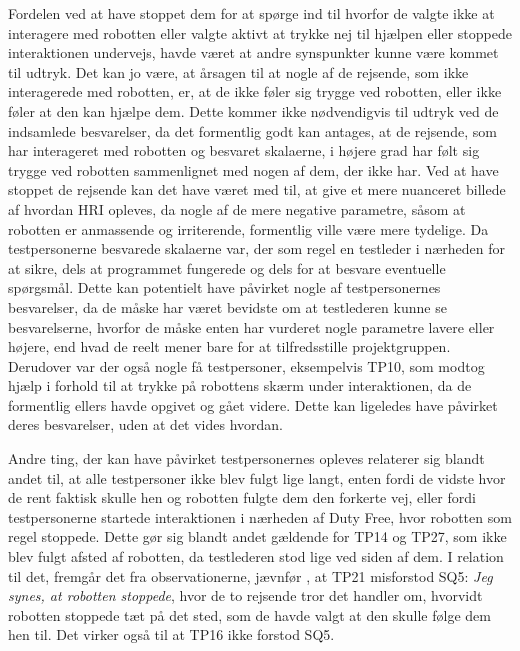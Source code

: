 Fordelen ved at have stoppet dem for at spørge ind til hvorfor de valgte ikke at interagere med robotten eller valgte aktivt at trykke nej til hjælpen eller stoppede interaktionen undervejs, havde været at andre synspunkter kunne være kommet til udtryk. Det kan jo være, at årsagen til at nogle af de rejsende, som ikke interagerede med robotten, er, at de ikke føler sig trygge ved robotten, eller ikke føler at den kan hjælpe dem. Dette kommer ikke nødvendigvis til udtryk ved de indsamlede besvarelser, da det formentlig godt kan antages, at de rejsende, som har interageret med robotten og besvaret skalaerne, i højere grad har følt sig trygge ved robotten sammenlignet med nogen af dem, der ikke har. Ved at have stoppet de rejsende kan det have været med til, at give et mere nuanceret billede af hvordan HRI opleves, da nogle af de mere negative parametre, såsom at robotten er anmassende og irriterende, formentlig ville være mere tydelige. \blankline
%
Da testpersonerne besvarede skalaerne var, der som regel en testleder i nærheden for at sikre, dels at programmet fungerede og dels for at besvare eventuelle spørgsmål. Dette kan potentielt have påvirket nogle af testpersonernes besvarelser, da de måske har været bevidste om at testlederen kunne se besvarelserne, hvorfor de måske enten har vurderet nogle parametre lavere eller højere, end hvad de reelt mener bare for at tilfredsstille projektgruppen. Derudover var der også nogle få testpersoner, eksempelvis TP10, som modtog hjælp i forhold til at trykke på robottens skærm under interaktionen, da de formentlig ellers havde opgivet og gået videre. Dette kan ligeledes have påvirket deres besvarelser, uden at det vides hvordan. 

Andre ting, der kan have påvirket testpersonernes opleves relaterer sig blandt andet til, at alle testpersoner ikke blev fulgt lige langt, enten fordi de vidste hvor de rent faktisk skulle hen og robotten fulgte dem den forkerte vej, eller fordi testpersonerne startede interaktionen i nærheden af Duty Free, hvor robotten som regel stoppede. Dette gør sig blandt andet gældende for TP14 og TP27, som ikke blev fulgt afsted af robotten, da testlederen stod lige ved siden af dem. I relation til det, fremgår det fra observationerne, jævnfør , at TP21 misforstod SQ5: \textit{Jeg synes, at robotten stoppede}, hvor de to rejsende tror det handler om, hvorvidt robotten stoppede tæt på det sted, som de havde valgt at den skulle følge dem hen til. Det virker også til at TP16 ikke forstod SQ5. 

